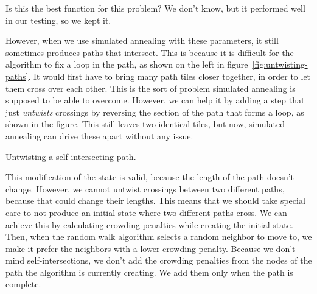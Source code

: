 Is this the best function for this problem?
We don't know, but it performed well in our testing, so we kept it.

However, when we use simulated annealing with these parameters, it still sometimes produces paths that intersect.
This is because it is difficult for the algorithm to fix a loop in the path, as shown on the left in figure~\ref{fig:untwisting-paths}.
It would first have to bring many path tiles closer together, in order to let them cross over each other.
This is the sort of problem simulated annealing is supposed to be able to overcome.
However, we can help it by adding a step that just \emph{untwists} crossings by reversing the section of the path that forms a loop, as shown in the figure.
This still leaves two identical tiles, but now, simulated annealing can drive these apart without any issue.

\begin{center}
    \captionsetup{type=figure}
    \caption{Untwisting a self-intersecting path.}
    \label{fig:untwisting-paths}
\end{center}

This modification of the state is valid, because the length of the path doesn't change.
However, we cannot untwist crossings between two different paths, because that could change their lengths.
This means that we should take special care to not produce an initial state where two different paths cross.
We can achieve this by calculating crowding penalties while creating the initial state.
Then, when the random walk algorithm selects a random neighbor to move to, we make it prefer the neighbors with a lower crowding penalty.
Because we don't mind self-intersections, we don't add the crowding penalties from the nodes of the path the algorithm is currently creating.
We add them only when the path is complete.

